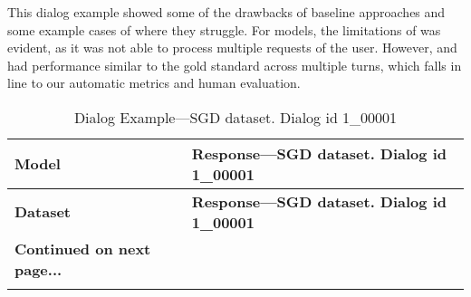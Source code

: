 This dialog example showed some of the drawbacks of baseline approaches and some example cases of where they struggle. For {\oursys} models, the limitations of {\gpt} was evident, as it was not able to process multiple requests of the user. However, {\llamai} and {\flan} had performance similar to the gold standard across multiple turns, which falls in line to our automatic metrics and human evaluation.

\begin{longtable}{>{\raggedright}p{2cm}|p{13cm}}
    \caption{Dialog Example---SGD dataset. Dialog id 1\_00001} \label{tab:rest_dialog}\\  
    \hline
    \textbf{Model} & \textbf{Response---SGD dataset. Dialog id 1\_00001}  \\  
    \hline
    \endfirsthead

    \hline
    \textbf{Dataset} & \textbf{Response---SGD dataset. Dialog id 1\_00001 }  \\  
    \hline
    \endhead

    \hline
    \textbf{Continued on next page...} & \\  
    \hline
    \endfoot

    \hline
    \endlastfoot



\end{longtable}
